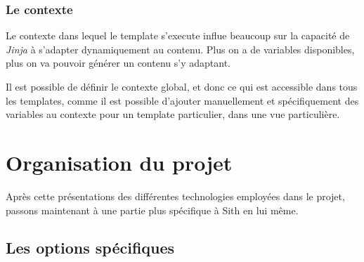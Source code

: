 \documentclass[a4paper]{report}
\begin{document}
\subsection{Le contexte}
\label{sub:le_contexte}
\par Le contexte dans lequel le template s'execute influe beaucoup sur la capacité de \emph{Jinja} à s'adapter
dynamiquement au contenu. Plus on a de variables disponibles, plus on va pouvoir générer un contenu s'y adaptant.
\par Il est possible de définir le contexte global, et donc ce qui est accessible dans tous les templates, comme il est
possible d'ajouter manuellement et spécifiquement des variables au contexte pour un template particulier, dans une vue
particulière.

\chapter{Organisation du projet}
\label{cha:organisation_du_projet}

\par Après cette présentations des différentes technologies employées dans le projet, passons maintenant à une partie plus
spécifique à Sith en lui même.

\section{Les options spécifiques}
\label{sec:les_options_sp_cifiques}
\end{document}
